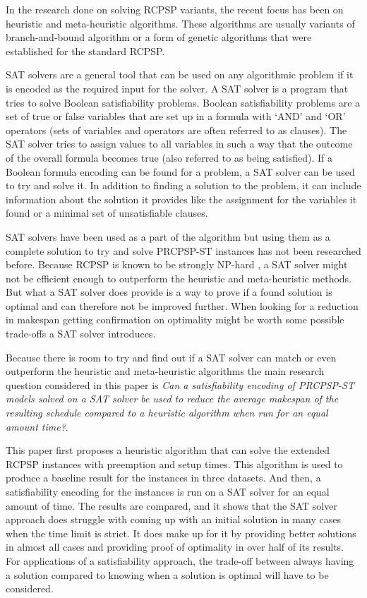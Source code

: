 In the research done on solving RCPSP variants, the recent focus has been on heuristic and meta-heuristic algorithms. These algorithms are usually variants of branch-and-bound algorithm \cite{RN21} or a form of genetic algorithms \cite{RN28} that were established for the standard RCPSP.

SAT solvers are a general tool that can be used on any algorithmic problem if it is encoded as the required input for the solver. A SAT solver is a program that tries to solve Boolean satisfiability problems. Boolean satisfiability problems are a set of true or false variables that are set up in a formula with ‘AND’ and ‘OR’ operators (sets of variables and operators are often referred to as clauses). The SAT solver tries to assign values to all variables in such a way that the outcome of the overall formula becomes true (also referred to as being satisfied). If a Boolean formula encoding can be found for a problem, a SAT solver can be used to try and solve it. In addition to finding a solution to the problem, it can include information about the solution it provides like the assignment for the variables it found or a minimal set of unsatisfiable clauses.

SAT solvers have been used as a part of the algorithm but using them as a complete solution to try and solve PRCPSP-ST instances has not been researched before. Because RCPSP is known to be strongly NP-hard \cite{RN20}, a SAT solver might not be efficient enough to outperform the heuristic and meta-heuristic methods. But what a SAT solver does provide is a way to prove if a found solution is optimal and can therefore not be improved further. When looking for a reduction in makespan getting confirmation on optimality might be worth some possible trade-offs a SAT solver introduces.

Because there is room to try and find out if a SAT solver can match or even outperform the heuristic and meta-heuristic algorithms the main research question considered in this paper is \textit{Can a satisfiability encoding of PRCPSP-ST models solved on a SAT solver be used to reduce the average makespan of the resulting schedule compared to a heuristic algorithm when run for an equal amount time?}.

This paper first proposes a heuristic algorithm that can solve the extended RCPSP instances with preemption and setup times. This algorithm is used to produce a baseline result for the instances in three datasets. And then, a satisfiability encoding for the instances is run on a SAT solver for an equal amount of time. The results are compared, and it shows that the SAT solver approach does struggle with coming up with an initial solution in many cases when the time limit is strict. It does make up for it by providing better solutions in almost all cases and providing proof of optimality in over half of its results. For applications of a satisfiability approach, the trade-off between always having a solution compared to knowing when a solution is optimal will have to be considered.


